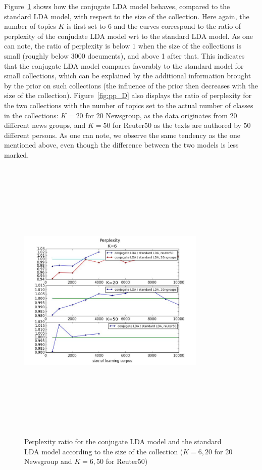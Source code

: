 Figure~\ref{fig:pp-size} shows how the conjugate LDA model behaves, compared to the standard LDA model, with respect to the size of the collection. Here again, the number of topics $K$ is first set to $6$ and the curves correspond to the ratio of perplexity of the conjudate LDA model wrt to the standard LDA model. As one can note, the ratio of perplexity is below $1$ when the size of the collections is small (roughly below 3000 documents), and above 1 after that. This indicates that the conjugate LDA model compares favorably to the standard model for small collections, which can be explained by the additional information brought by the prior on such collections (the influence of the prior then decreases with the size of the collection). Figure~\ref{fig:pp_D} also displays the ratio of perplexity for the two collections with the number of topics set to the actual number of classes in the collections: $K=20$ for 20 Newsgroup, as the data originates from $20$ different news groups, and $K=50$ for Reuter50 as the texts are authored by $50$ different persons. As one can note, we observe the same tendency as the one mentioned above, even though the difference between the two models is less marked.

\begin{figure}[ht]
\label{fig:pp-size}
\includegraphics[width=9cm, height=14cm]{results/pp_D}
\caption{Perplexity ratio for the conjugate LDA model and the standard LDA model according to the size of the collection ($K=6,20$ for 20 Newsgroup and $K=6,50$ for Reuter50)}
\end{figure}


